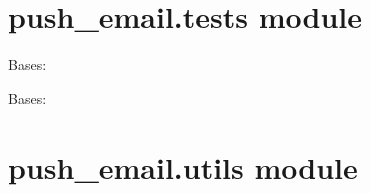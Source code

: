 \documentclass[letterpaper,10pt,english]{sphinxmanual}
\begin{document}
\section{push\_email.tests module}
\label{push_email:module-push_email.tests}\label{push_email:push-email-tests-module}

\begin{fulllineitems}
\label{push_email:push_email.tests.EmailTestCase}
Bases: 

\begin{fulllineitems}
\label{push_email:push_email.tests.EmailTestCase.test_email_creation}
\end{fulllineitems}


\end{fulllineitems}


\begin{fulllineitems}
\label{push_email:push_email.tests.ThreadTestCase}
Bases: 

\begin{fulllineitems}
\label{push_email:push_email.tests.ThreadTestCase.test_thread}
\end{fulllineitems}


\end{fulllineitems}



\section{push\_email.utils module}
\label{push_email:module-push_email.utils}\label{push_email:push-email-utils-module}
\end{document}
